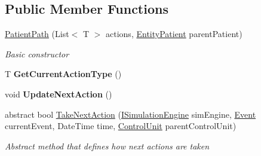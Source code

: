 \subsection*{Public Member Functions}
\begin{DoxyCompactItemize}
\item 
\hyperlink{class_general_health_care_elements_1_1_general_classes_1_1_action_types_and_paths_1_1_patient_path_a9c4b6f98b209db122f22d4c70c4c32a6}{Patient\+Path} (List$<$ T $>$ actions, \hyperlink{class_general_health_care_elements_1_1_entities_1_1_entity_patient}{Entity\+Patient} parent\+Patient)
\begin{DoxyCompactList}\small\item\em Basic constructor \end{DoxyCompactList}\item 
T {\bfseries Get\+Current\+Action\+Type} ()\hypertarget{class_general_health_care_elements_1_1_general_classes_1_1_action_types_and_paths_1_1_patient_path_af143e4c76cd37979879d9cdf891f4160}{}\label{class_general_health_care_elements_1_1_general_classes_1_1_action_types_and_paths_1_1_patient_path_af143e4c76cd37979879d9cdf891f4160}

\item 
void {\bfseries Update\+Next\+Action} ()\hypertarget{class_general_health_care_elements_1_1_general_classes_1_1_action_types_and_paths_1_1_patient_path_ab041e9e7756f3e84830f94e7205ed532}{}\label{class_general_health_care_elements_1_1_general_classes_1_1_action_types_and_paths_1_1_patient_path_ab041e9e7756f3e84830f94e7205ed532}

\item 
abstract bool \hyperlink{class_general_health_care_elements_1_1_general_classes_1_1_action_types_and_paths_1_1_patient_path_a69cdc1710f316972e8dc7c22552e8227}{Take\+Next\+Action} (\hyperlink{interface_simulation_core_1_1_simulation_classes_1_1_i_simulation_engine}{I\+Simulation\+Engine} sim\+Engine, \hyperlink{class_simulation_core_1_1_h_c_c_m_elements_1_1_event}{Event} current\+Event, Date\+Time time, \hyperlink{class_simulation_core_1_1_h_c_c_m_elements_1_1_control_unit}{Control\+Unit} parent\+Control\+Unit)
\begin{DoxyCompactList}\small\item\em Abstract method that defines how next actions are taken \end{DoxyCompactList}\end{DoxyCompactItemize}
